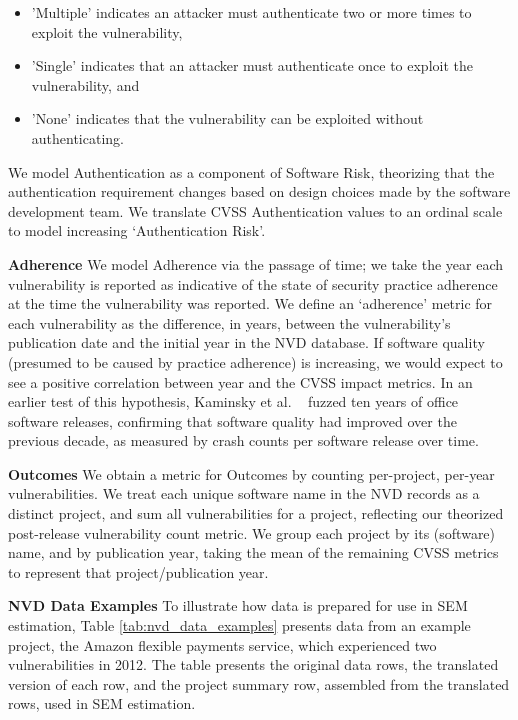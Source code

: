 \begin{itemize}
\begin{itemize}
		\item 'Multiple' indicates an attacker must authenticate two or more times to exploit the vulnerability, 
		\item 'Single' indicates that an attacker must authenticate once to exploit the vulnerability, and 
		\item 'None' indicates that the vulnerability can be exploited without authenticating.  
	\end{itemize}
	We model Authentication as a component of Software Risk, theorizing that the authentication requirement changes based on design choices made by the software development team. We translate CVSS Authentication values to an ordinal scale to model increasing `Authentication Risk'.
\end{itemize}
  
\textbf{Adherence}
We model Adherence via the passage of time; we take the year each vulnerability is reported as indicative of the state of security practice adherence at the time the vulnerability was reported. We define an `adherence' metric for each vulnerability as the difference, in years, between the vulnerability's publication date and the initial year in the NVD database. If software quality (presumed to be caused by practice adherence) is increasing, we would expect to see a positive correlation between year and the CVSS impact metrics.  In an earlier test of this hypothesis, Kaminsky et al. ~\cite{kaminsky2011showing} fuzzed ten years of office software releases, confirming that software quality had improved over the previous decade, as measured by crash counts per software release over time. 
    
\textbf{Outcomes}
We obtain a metric for Outcomes by counting per-project, per-year vulnerabilities. We treat each unique software name in the NVD records as a distinct project, and sum all vulnerabilities for a project, reflecting our theorized post-release vulnerability count metric. We group each project by its (software) name, and by publication year, taking the mean of the remaining CVSS metrics to represent that project/publication year. 

\textbf{NVD Data Examples}
To illustrate how data is prepared for use in SEM estimation, Table \ref{tab:nvd_data_examples} presents data from an example project, the Amazon flexible payments service, which experienced two vulnerabilities in 2012. The table presents the original data rows, the translated version of each row, and the project summary row, assembled from the translated rows, used in SEM estimation.

